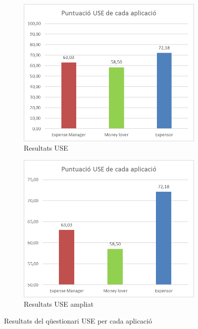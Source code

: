 \begin{figure}
	\centering
	
	\begin{subfigure}[b]{0.45\textwidth}
		\centering
		\includegraphics[scale=0.6]{USE_1.png}
		\caption{Resultats USE}
		\label{fig:USE_1}
	\end{subfigure}
	\quad
	\begin{subfigure}[b]{0.45\textwidth}
		\centering
		\includegraphics[scale=0.6]{USE_2.png}
		\caption{Resultats USE ampliat}
		\label{fig:USE_2}
	\end{subfigure}

\caption{Resultats del qüestionari USE per cada aplicació}\label{fig:USE_result}
\end{figure}


